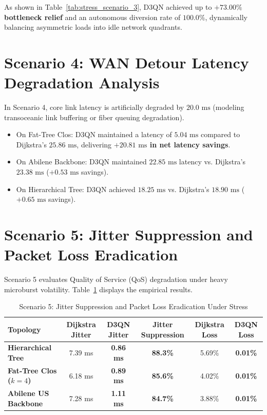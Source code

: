 \documentclass[12pt,a4paper,oneside]{report}
\begin{document}
As shown in Table~\ref{tab:stress_scenario_3}, D3QN achieved up to \textbf{$+73.00\%$ bottleneck relief} and an autonomous diversion rate of \textbf{$100.0\%$}, dynamically balancing asymmetric loads into idle network quadrants.

\section{Scenario 4: WAN Detour Latency Degradation Analysis}
In Scenario 4, core link latency is artificially degraded by $20.0\text{ ms}$ (modeling transoceanic link buffering or fiber queuing degradation).
\begin{itemize}
    \item On Fat-Tree Clos: D3QN maintained a latency of \textbf{$5.04\text{ ms}$} compared to Dijkstra's $25.86\text{ ms}$, delivering \textbf{$+20.81\text{ ms}$ in net latency savings}.
    \item On Abilene Backbone: D3QN maintained $22.85\text{ ms}$ latency vs. Dijkstra's $23.38\text{ ms}$ ($+0.53\text{ ms}$ savings).
    \item On Hierarchical Tree: D3QN achieved $18.25\text{ ms}$ vs. Dijkstra's $18.90\text{ ms}$ ($+0.65\text{ ms}$ savings).
\end{itemize}

\section{Scenario 5: Jitter Suppression and Packet Loss Eradication}
Scenario 5 evaluates Quality of Service (QoS) degradation under heavy microburst volatility. Table~\ref{tab:stress_scenario_5} displays the empirical results.

\begin{table}[htbp]
\centering
\caption{Scenario 5: Jitter Suppression and Packet Loss Eradication Under Stress}
\label{tab:stress_scenario_5}
\small
\begin{tabularx}{\textwidth}{l c c c c c}
\toprule
\textbf{Topology} & \textbf{Dijkstra Jitter} & \textbf{D3QN Jitter} & \textbf{Jitter Suppression} & \textbf{Dijkstra Loss} & \textbf{D3QN Loss} \\
\midrule
\textbf{Hierarchical Tree} & 7.39 ms & \textbf{0.86 ms} & \textbf{88.3\%} & 5.69\% & \textbf{0.01\%} \\
\textbf{Fat-Tree Clos ($k=4$)} & 6.18 ms & \textbf{0.89 ms} & \textbf{85.6\%} & 4.02\% & \textbf{0.01\%} \\
\textbf{Abilene US Backbone} & 7.28 ms & \textbf{1.11 ms} & \textbf{84.7\%} & 3.88\% & \textbf{0.01\%} \\
\bottomrule
\end{tabularx}
\end{table}
\end{document}
